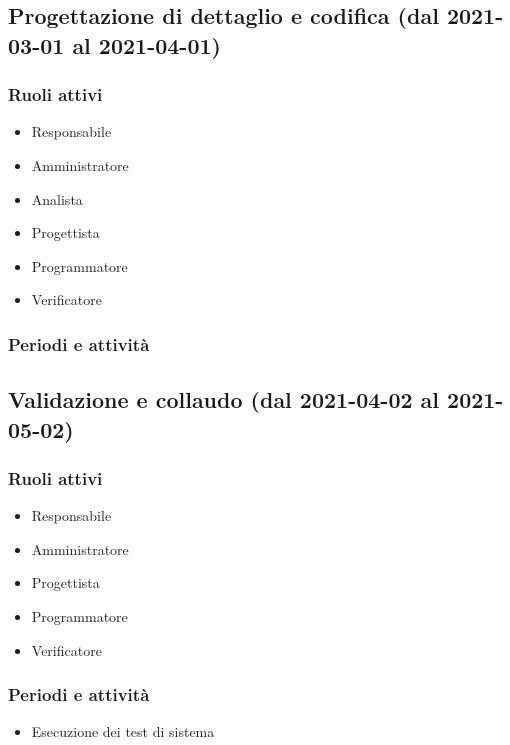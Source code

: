 \subsection{Progettazione di dettaglio e codifica (dal 2021-03-01 al 2021-04-01)}

\subsubsection{Ruoli attivi}
\begin{itemize}
	\item Responsabile
	\item Amministratore
	\item Analista
	\item Progettista
	\item Programmatore
	\item Verificatore
\end{itemize}

\subsubsection{Periodi e attività}


\subsection{Validazione e collaudo (dal 2021-04-02 al 2021-05-02)}

\subsubsection{Ruoli attivi}
\begin{itemize}
	\item Responsabile
	\item Amministratore
	\item Progettista
	\item Programmatore
	\item Verificatore
\end{itemize}

\subsubsection{Periodi e attività}
\begin{itemize}
	\item Esecuzione dei test di sistema
\end{itemize}

